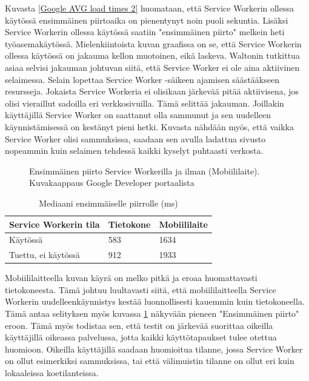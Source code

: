 \documentclass{tktltiki}
\begin{document}
Kuvasta \ref{Google AVG load times 2} huomataan, että Service Workerin ollessa käytössä ensimmäinen piirtoaika on pienentynyt noin puoli sekuntia. Lisäksi Service Workerin ollessa käytössä saatiin "ensimmäinen piirto" melkein heti työasemakäytössä. Mielenkiintoista kuvan graafissa on se, että Service Workerin ollessa käytössä on jakauma kellon muotoinen, eikä laskeva. Waltonin tutkittua asiaa selvisi jakauman johtuvan siitä, että Service Worker ei ole aina aktiivinen selaimessa. Selain lopettaa Service Worker -säikeen ajamisen säästääkseen resursseja. Jokaista Service Workeria ei olisikaan järkevää pitää aktiivisena, jos olisi vieraillut sadoilla eri verkkosivuilla. Tämä selittää jakauman. Joillakin käyttäjillä Service Worker on saattanut olla sammunut ja sen uudelleen käynnistämisessä on kestänyt pieni hetki. Kuvasta  nähdään myös, että vaikka Service Worker olisi sammuksissa, saadaan sen avulla ladattua sivusto nopeammin kuin selaimen tehdessä kaikki kyselyt puhtaasti verkosta. 

\clearpage

\begin{figure}[h]
\begin{center}
\caption{Ensimmäinen piirto Service Workerilla ja ilman (Mobiililaite). Kuvakaappaus Google Developer portaalista \cite{Walton}}
\label{Google AVG load times 3}
\end{center}
\end{figure}

\begin{table}[h]
\centering
\begin{small}
\caption{Mediaani ensimmäiselle piirrolle (ms) }
\begin{tabular}{|L{5cm}|L{3cm}|L{3cm}|}
\hline
\textbf{Service Workerin tila} & 
\textbf{Tietokone} &
\textbf{Mobiililaite}
\\ \hline
Käytössä & 
583 &
1634
\\ \hline
Tuettu, ei käytössä &
912 &
1933
\\ \hline
\end{tabular}
\label{table:median first paint}
\end{small}
\end{table}

Mobiililaitteella kuvan käyrä on melko pitkä ja eroaa huomattavasti tietokoneesta. Tämä johtuu luultavasti siitä, että mobiililaitteella Service Workerin uudelleenkäynnistys kestää luonnollisesti kauemmin kuin tietokoneella. Tämä antaa selityksen myös kuvassa \ref{Google AVG load times 3} näkyvään pieneen "Ensimmäinen piirto" eroon. Tämä myös todistaa sen, että testit on järkevää suorittaa oikeilla käyttäjillä oikeassa palvelussa, jotta kaikki käyttötapaukset tulee otettua huomioon. Oikeilla käyttäjillä saadaan huomioitua tilanne, jossa Service Worker on ollut esimerkiksi sammuksissa, tai että välimuistin tilanne on ollut eri kuin lokaaleissa koetilanteissa.
\end{document}
